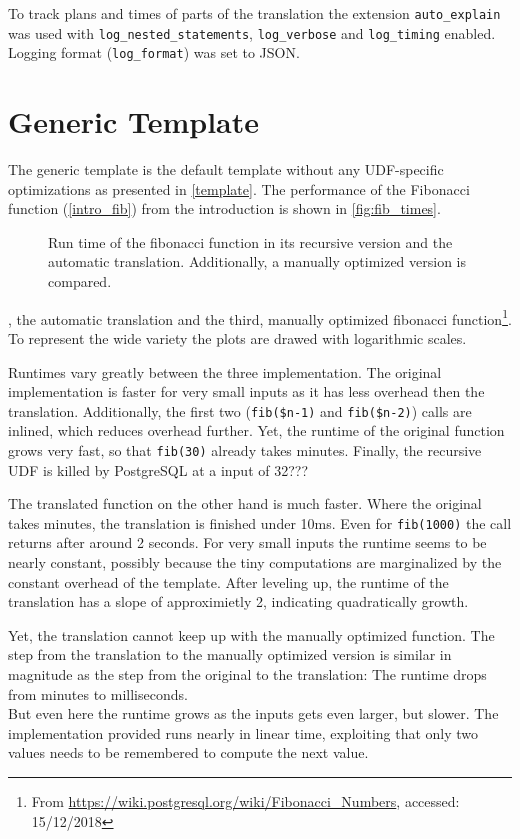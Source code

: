 To track plans and times of parts of the translation the extension \texttt{auto\_explain} was used with \texttt{log\_nested\_statements}, \texttt{log\_verbose} and \texttt{log\_timing} enabled. Logging format (\texttt{log\_format}) was set to JSON.

\section{Generic Template}

The generic template is the default template without any UDF-specific optimizations as presented in \autoref{template}. The performance of the Fibonacci function (\autoref{intro_fib}) from the introduction is shown in \autoref{fig:fib_times}.

\begin{figure}[h!]
    \centering\small
    
    \caption{Run time of the fibonacci function in its recursive version and the automatic translation. Additionally, a manually optimized version is compared.}
    \label{fig:fib_times}
\end{figure}

, the automatic translation and the third, manually optimized fibonacci function\footnote{From \url{https://wiki.postgresql.org/wiki/Fibonacci_Numbers}, accessed: 15/12/2018}. To represent the wide variety the plots are drawed with logarithmic scales.

Runtimes vary greatly between the three implementation. The original implementation is faster for very small inputs as it has less overhead then the translation. Additionally, the first two (\texttt{fib(\$n-1)} and \texttt{fib(\$n-2)}) calls are inlined, which reduces overhead further. Yet, the runtime of the original function grows very fast, so that \texttt{fib(30)} already takes minutes. Finally, the recursive UDF is killed by PostgreSQL at a input of 32???

The translated function on the other hand is much faster. Where the original takes minutes, the translation is finished under 10ms. Even for \texttt{fib(1000)} the call returns after around 2 seconds. For very small inputs the runtime seems to be nearly constant, possibly because the tiny computations are marginalized by the constant overhead of the template. After leveling up, the runtime of the translation has a slope of approximietly 2, indicating quadratically growth.

Yet, the translation cannot keep up with the manually optimized function. The step from the translation to the manually optimized version is similar in magnitude as the step from the original to the translation: The runtime drops from minutes to milliseconds.\\
But even here the runtime grows as the inputs gets even larger, but slower. The implementation provided runs nearly in linear time, exploiting that only two values needs to be remembered to compute the next value.\\

